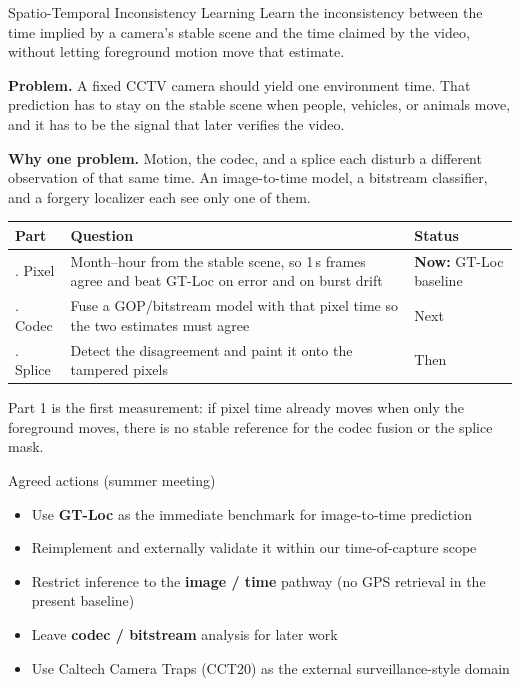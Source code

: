 \documentclass[aspectratio=169,11pt]{beamer}
\begin{document}
\begin{frame}{Spatio-Temporal Inconsistency Learning}
\footnotesize\setlength{\parskip}{0pt}\setlength{\tabcolsep}{3pt}
Learn the inconsistency between the time implied by a camera's stable scene and the time claimed by the video, without letting foreground motion move that estimate.

\textbf{Problem.} A fixed CCTV camera should yield one environment time. That prediction has to stay on the stable scene when people, vehicles, or animals move, and it has to be the signal that later verifies the video.

\textbf{Why one problem.} Motion, the codec, and a splice each disturb a different observation of that same time. An image-to-time model, a bitstream classifier, and a forgery localizer each see only one of them.
\vspace{0.1em}
\begin{center}
\renewcommand{\arraystretch}{1.05}
\begin{tabular}{@{}>{\raggedright\arraybackslash}p{}>{\raggedright\arraybackslash}p{}>{\raggedright\arraybackslash}p{}@{}}
\toprule
\textbf{Part} & \textbf{Question} & \textbf{Status} \\
\midrule
1. Pixel &
Month--hour from the stable scene, so 1\,s frames agree and beat GT-Loc on error and on burst drift &
\textbf{Now:} GT-Loc baseline \\
2. Codec &
Fuse a GOP/bitstream model with that pixel time so the two estimates must agree &
Next \\
3. Splice &
Detect the disagreement and paint it onto the tampered pixels &
Then \\
\bottomrule
\end{tabular}
\end{center}
\vspace{0.1em}
Part 1 is the first measurement: if pixel time already moves when only the foreground moves, there is no stable reference for the codec fusion or the splice mask.
\end{frame}

\begin{frame}{Agreed actions (summer meeting)}
\begin{itemize}
  \item Use \textbf{GT-Loc} as the immediate benchmark for image-to-time prediction
  \item Reimplement and externally validate it within our time-of-capture scope
  \item Restrict inference to the \textbf{image / time} pathway (no GPS retrieval in the present baseline)
  \item Leave \textbf{codec / bitstream} analysis for later work
  \item Use Caltech Camera Traps (CCT20) as the external surveillance-style domain
\end{itemize}
\end{frame}
\end{document}
